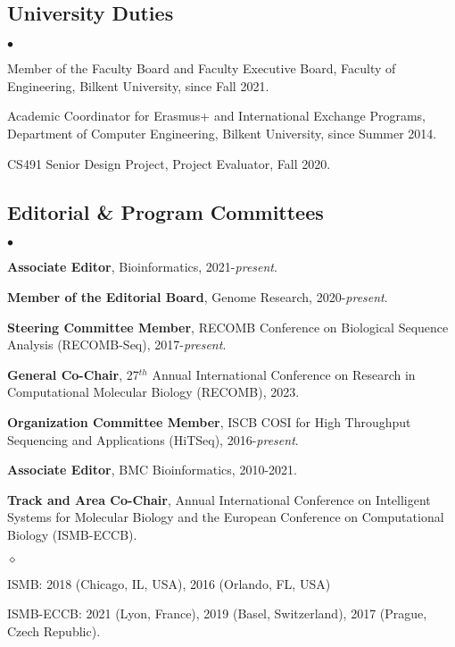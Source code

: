 \documentclass[margin,line]{res}
\newenvironment{list2}{
  \begin{list}{$\bullet$}{%
      \setlength{\itemsep}{0.1cm}
      \setlength{\parsep}{0in} \setlength{\parskip}{0in}
      \setlength{\topsep}{0in} \setlength{\partopsep}{0in} 
      \setlength{\leftmargin}{0.2in}}}{\end{list}}
\newenvironment{list3}{
  \begin{list}{$\diamond$}{%
      \setlength{\itemsep}{0in}
      \setlength{\parsep}{0.1cm} \setlength{\parskip}{0.1cm}
      \setlength{\topsep}{0.1cm} \setlength{\partopsep}{0.1cm} 
      \setlength{\leftmargin}{0.2in}}}{\end{list}}
\begin{document}
\begin{resume}
\subsection{\small \sc University Duties}
\begin{list2}
\item 
 Member of the Faculty Board and Faculty Executive Board, Faculty of Engineering, Bilkent University, since Fall 2021.
\item
  Academic Coordinator for Erasmus+ and International Exchange Programs, Department of Computer Engineering, Bilkent University, since Summer 2014.
  \item CS491 Senior Design Project, Project Evaluator, Fall 2020.
\end{list2}
\vspace{-0.4cm}


\subsection{\small \sc Editorial \& Program Committees}
\begin{list2}
\item
    \textbf{Associate Editor}, Bioinformatics, 2021-\textit{present}.
\item
    \textbf{Member of the Editorial Board}, Genome Research, 2020-\textit{present}.
\item
  \textbf{Steering Committee Member}, RECOMB Conference on Biological Sequence Analysis (RECOMB-Seq), 2017-{\it present}.
  \item
  \textbf{General Co-Chair}, 27$^{th}$ Annual International Conference on Research in Computational Molecular Biology (RECOMB), 2023.
\item
  \textbf{Organization Committee Member}, ISCB COSI for High Throughput Sequencing and Applications (HiTSeq),
  2016-{\it present}.
\item
  \textbf{Associate Editor}, BMC Bioinformatics, 2010-2021.

\item
  \textbf{Track and Area Co-Chair}, Annual International Conference on Intelligent Systems for Molecular Biology and the European Conference on 
  Computational Biology (ISMB-ECCB).
  \begin{list3}
    \item ISMB: 2018 (Chicago, IL, USA), 2016 (Orlando, FL, USA)
    \item ISMB-ECCB: 2021 (Lyon, France), 2019 (Basel, Switzerland), 2017 (Prague, Czech Republic).
  \end{list3}


\end{list2}
\end{resume}
\end{document}

